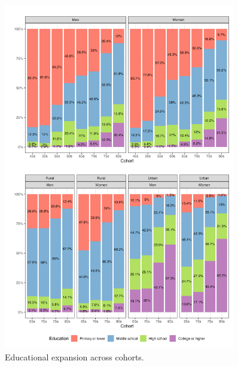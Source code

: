 \begin{figure}[H]
    \centering
    \includegraphics[width=0.9\textwidth]{chapters/chapter4/figures/edu_comp.png}
    \caption{Educational expansion across cohorts.}
    \label{fig:edu_comp}
\end{figure}


